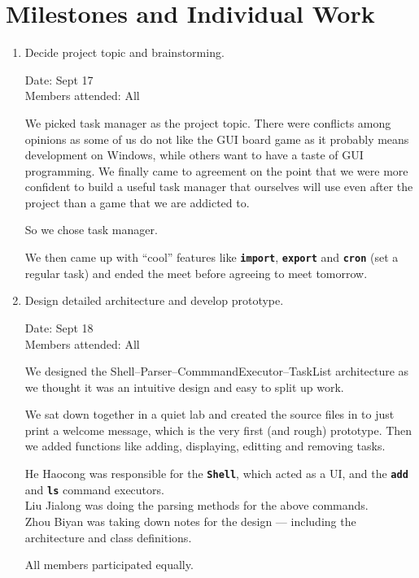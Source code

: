 \documentclass[12pt, a4paper]{article}
\newcommand{\cmdinline}[1]{{\bf \texttt{#1}}}
\begin{document}
\newpage
\section{Milestones and Individual Work}
\begin{enumerate}
\item Decide project topic and brainstorming.

Date: Sept 17 \\
Members attended: All

We picked task manager as the project topic. There were conflicts among opinions as some of us do not like the GUI board game as it probably means development on Windows, while others want to have a taste of GUI programming. We finally came to agreement on the point that we were more confident to build a useful task manager that ourselves will use even after the project than a game that we are addicted to.

So we chose task manager.

We then came up with ``cool'' features like \cmdinline{import}, \cmdinline{export} and \cmdinline{cron} (set a regular task) and ended the meet before agreeing to meet tomorrow.

\item Design detailed architecture and develop prototype.

Date: Sept 18\\
Members attended: All

We designed the Shell--Parser--CommmandExecutor--TaskList architecture as we thought it was an intuitive design and easy to split up work.

We sat down together in a quiet lab and created the source files in to just print a welcome message, which is the very first (and rough) prototype. Then we added functions like adding, displaying, editting and removing tasks.

He Haocong was responsible for the \cmdinline{Shell}, which acted as a UI, and the \cmdinline{add} and \cmdinline{ls} command executors.\\
Liu Jialong was doing the parsing methods for the above commands.\\
Zhou Biyan was taking down notes for the design --- including the architecture and class definitions.

All members participated equally.


\end{enumerate}
\end{document}
